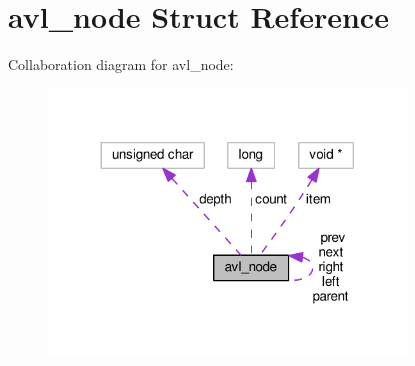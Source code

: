 \hypertarget{structavl__node}{}\section{avl\+\_\+node Struct Reference}
\label{structavl__node}


Collaboration diagram for avl\+\_\+node\+:\nopagebreak
\begin{figure}[H]
\begin{center}
\leavevmode
\includegraphics[width=269pt]{structavl__node__coll__graph}
\end{center}
\end{figure}
